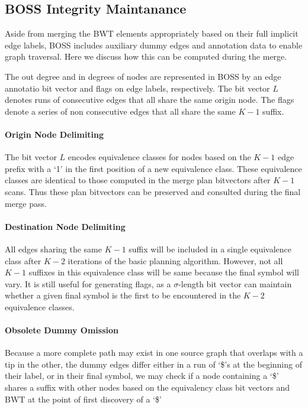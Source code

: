 \documentclass[doctor]{thesis}
\begin{document}
\subsection{BOSS Integrity Maintanance}
Aside from merging the BWT elements appropriately based on their full implicit edge labels, BOSS includes auxiliary dummy edges and annotation data to enable graph traversal.  Here we discuss how this can be computed during the merge.

The out degree and in degrees of nodes are represented in BOSS by an edge annotatio bit vector and flags on edge labels, respectively.  The bit vector $L$ denotes runs of consecutive edges that all share the same origin node.  The flags denote a series of non consecutive edges that all share the same $K-1$ suffix.  

\paragraph{Origin Node Delimiting}
The bit vector $L$  encodes equivalence classes for nodes based on the $K-1$ edge prefix with a `1' in the first position of a new equivalence class.  These equivalence classes are identical to those computed in the merge plan bitvectors after $K-1$ scans.  Thus these plan bitvectors can be preserved and consulted during the final merge pass.  

\paragraph{Destination Node Delimiting}
All edges sharing the same $K-1$ suffix will be included in a single equivalence class after $K-2$ iterations of the basic planning algorithm.  However, not all $K-1$ suffixes in this equivalence class will be same because the final symbol will vary.  It is still useful for generating flags, as a $\sigma$-length bit vector can maintain whether a given final symbol is the first to be encountered in the $K-2$ equivalence classes.  

\paragraph{Obsolete Dummy Omission}
Because a more complete path may exist in one source graph that overlaps with a tip in the other, the dummy edges differ either in a run of `\$'s at the beginning of their label, or in their final symbol, we may check if a node containing a `\$' shares a suffix with other nodes based on the equivalency class bit vectors and BWT at the point of first discovery of a `\$'
\end{document}
